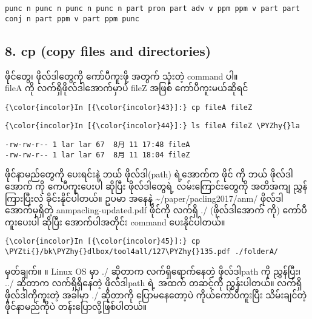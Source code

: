 \documentclass[11pt]{article}
\def\PYZhy{\char`\-}
\def\PYZti{\char`\~}
\begin{document}
    \begin{Verbatim}[commandchars=\\\{\}]
punc n punc n punc n punc n part pron part adv v ppm ppm v part part conj n part ppm v part ppm punc

    \end{Verbatim}

    \subsection{8. cp (copy files and
directories)}\label{cp-copy-files-and-directories}

ဖိုင်တွေ၊ ဖိုလ်ဒါတွေကို ကော်ပီကူးဖို့ အတွက် သုံးတဲ့ command ပါ။\\
fileA ကို လက်ရှိဖိုလ်ဒါအောက်မှာပဲ fileZ အဖြစ် ကော်ပီကူးမယ်ဆိုရင်

    \begin{Verbatim}[commandchars=\\\{\}]
{\color{incolor}In [{\color{incolor}43}]:} cp fileA fileZ
\end{Verbatim}

    \begin{Verbatim}[commandchars=\\\{\}]
{\color{incolor}In [{\color{incolor}44}]:} ls fileA fileZ \PYZhy{}la
\end{Verbatim}

    \begin{Verbatim}[commandchars=\\\{\}]
-rw-rw-r-- 1 lar lar 67  8月 11 17:48 fileA
-rw-rw-r-- 1 lar lar 67  8月 11 18:04 fileZ

    \end{Verbatim}

    ဖိုင်နာမည်တွေကို ပေးရင်းနဲ့ ဘယ် ဖိုလ်ဒါ(path) ရဲ့အောက်က ဖိုင် ကို ဘယ်
ဖိုလ်ဒါအောက် ကို ကေပီကူးပေးပါ ဆိုပြီး ဖိုလ်ဒါတွေရဲ့ လမ်းကြောင်းတွေကို
အတိအကျ ညွှန်ကြားပြီးလဲ ခိုင်းနိုင်ပါတယ်။ ဥပမာ အနေနဲ့
\textasciitilde{}/paper/pacling2017/anm/ ဖိုလ်ဒါအောက်မှရှိတဲ့
anmpacling-updated.pdf ဖိုင်ကို လက်ရှိ ./ (ဖိုလ်ဒါအောက် ကို)
ကော်ပီကူးပေးပါ ဆိုပြီး အောက်ပါအတိုင်း command ပေးနိုင်ပါတယ်။

    \begin{Verbatim}[commandchars=\\\{\}]
{\color{incolor}In [{\color{incolor}45}]:} cp \PYZti{}/bk\PYZhy{}dlbox/tool4all/127\PYZhy{}135.pdf ./folderA/
\end{Verbatim}

    မှတ်ချက်။ ။ Linux OS မှာ ./ ဆိုတာက လက်ရှိရောက်နေတဲ့ ဖိုလ်ဒါpath ကို
ညွှန်ပြီး၊ ../ ဆိုတာက လက်ရှိရှိနေတဲ့ ဖိုလ်ဒါpath ရဲ့ အထက် တဆင့်ကို
ညွှန်းပါတယ်။ လက်ရှိ ဖိုလ်ဒါကိုကူးတဲ့ အခါမှာ ./ ဆိုတာကို ပြောမနေတော့ပဲ
ကိုယ်ကော်ပီကူးပြီး သိမ်းချင်တဲ့ ဖိုင်နာမည်ကိုပဲ တန်းပြောလို့ဖြစ်ပါတယ်။
\end{document}
